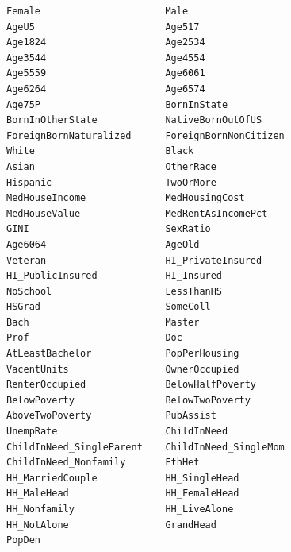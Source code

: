 \documentclass[compsoc]{IEEEtran}
\begin{document}
\printbibliography[title={References}]



\footnotesize{\begin{lstlisting}
Female                      Male                      
AgeU5                       Age517                    
Age1824                     Age2534                   
Age3544                     Age4554                   
Age5559                     Age6061                   
Age6264                     Age6574                   
Age75P                      BornInState               
BornInOtherState            NativeBornOutOfUS         
ForeignBornNaturalized      ForeignBornNonCitizen     
White                       Black                     
Asian                       OtherRace                 
Hispanic                    TwoOrMore                 
MedHouseIncome              MedHousingCost            
MedHouseValue               MedRentAsIncomePct        
GINI                        SexRatio                  
Age6064                     AgeOld                    
Veteran                     HI_PrivateInsured         
HI_PublicInsured            HI_Insured                
NoSchool                    LessThanHS                
HSGrad                      SomeColl                  
Bach                        Master                    
Prof                        Doc                       
AtLeastBachelor             PopPerHousing             
VacentUnits                 OwnerOccupied             
RenterOccupied              BelowHalfPoverty          
BelowPoverty                BelowTwoPoverty           
AboveTwoPoverty             PubAssist                 
UnempRate                   ChildInNeed               
ChildInNeed_SingleParent    ChildInNeed_SingleMom     
ChildInNeed_Nonfamily       EthHet                    
HH_MarriedCouple            HH_SingleHead             
HH_MaleHead                 HH_FemaleHead             
HH_Nonfamily                HH_LiveAlone              
HH_NotAlone                 GrandHead                 
PopDen                                
\end{lstlisting}}
\end{document}
